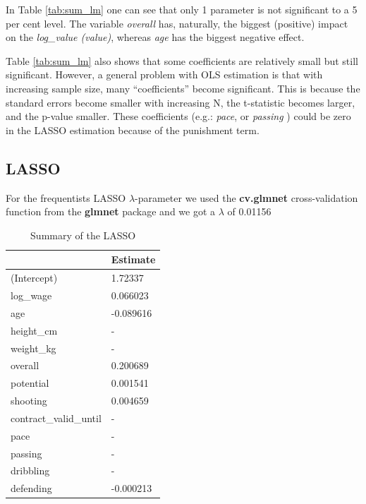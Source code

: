 \documentclass[12pt,a4paper]{article}
\begin{document}
In Table \ref{tab:sum_lm} one can see that only 1 parameter is not
significant to a 5 per cent level. The variable \emph{overall} has,
naturally, the biggest (positive) impact on the \emph{log\_value
(value)}, whereas \emph{age} has the biggest negative effect.

Table \ref{tab:sum_lm} also shows that some coefficients are relatively
small but still significant. However, a general problem with \ac{OLS}
estimation is that with increasing sample size, many
\enquote{coefficients} become significant. This is because the standard
errors become smaller with increasing N, the t-statistic becomes larger,
and the p-value smaller. These coefficients (e.g.: \emph{pace}, or
\emph{passing} ) could be zero in the \ac{LASSO} estimation because of
the punishment term.

\hypertarget{section-1}{%
\subsection{\texorpdfstring{\acf{LASSO}}{}}\label{section-1}}

For the frequentists \ac{LASSO} \(\lambda\)-parameter we used the
\textbf{cv.glmnet} cross-validation function from the \textbf{glmnet}
package and we got a \(\lambda\) of 0.01156
\textcite{hastle_glmnet_2019}

\begin{table}[!h]

\caption{\label{tab:unnamed-chunk-4}\label{tab:sum_lasso} Summary of the LASSO }
\centering
\begin{tabular}[t]{ll}
\toprule
  & Estimate\\
\midrule
\rowcolor{gray!6}  (Intercept) & 1.72337\\
log\_wage & 0.066023\\
\rowcolor{gray!6}  age & -0.089616\\
height\_cm & -\\
\rowcolor{gray!6}  weight\_kg & -\\
overall & 0.200689\\
\rowcolor{gray!6}  potential & 0.001541\\
shooting & 0.004659\\
\rowcolor{gray!6}  contract\_valid\_until & -\\
pace & -\\
\rowcolor{gray!6}  passing & -\\
dribbling & -\\
\rowcolor{gray!6}  defending & -0.000213\\
\bottomrule
\end{tabular}
\end{table}
\end{document}
